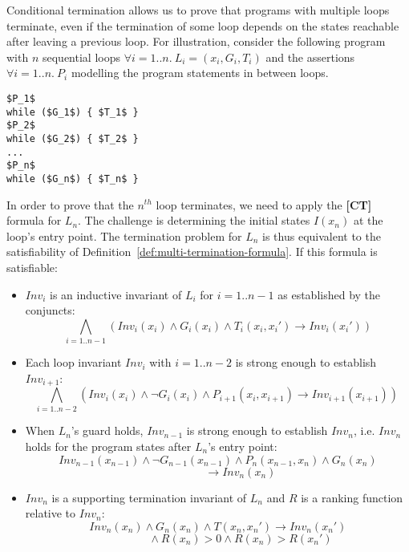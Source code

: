 \documentclass[preprint]{sigplanconf}
\theoremstyle{definition}
\begin{document}
\iffalse

Conditional termination allows us to
prove that programs with multiple loops terminate, even if the termination of some loop depends on the states
reachable after leaving a previous loop.
For illustration, consider the following program with $n$ sequential loops $\forall i=1..n. ~L_i=(x_i,G_i,T_i)$ and
the assertions $\forall i=1..n. ~P_i$ modelling the program statements in between loops. 

\begin{lstlisting}[mathescape=true]
$P_1$
while ($G_1$) { $T_1$ }
$P_2$
while ($G_2$) { $T_2$ }
...
$P_n$
while ($G_n$) { $T_n$ }
\end{lstlisting}

In order to prove that the $n^{th}$ loop terminates, we need to apply the {\bf [CT]} formula for $L_n$.
The challenge is determining the initial states  $I(x_n)$ at the loop's entry point.  
The termination problem for $L_n$ is thus equivalent to the satisfiability of
Definition~\ref{def:multi-termination-formula}.  If this formula is satisfiable:
\begin{itemize}
\item $Inv_i$ is an inductive invariant of $L_i$ for $i=1..{n-1}$ as established by the conjuncts:
$$\bigwedge_{i=1..n{-}1} (Inv_i(x_i) \wedge G_i(x_i) \wedge T_i(x_i, x_i') \rightarrow Inv_i(x_i')) $$

\item Each loop invariant $Inv_i$ with $i=1..{n-2}$ is strong enough to establish $Inv_{i+1}$:
$$\bigwedge_{i=1..n{-}2} (Inv_i(x_i) \wedge \lnot G_i(x_i) \wedge P_{i+1}(x_i, x_{i+1}) {\rightarrow} Inv_{i+1}(x_{i+1})) ~$$

\item When $L_n$'s guard holds, $Inv_{n-1}$ 
is strong enough to establish $Inv_n$, i.e. $Inv_n$ holds for the program states after $L_n$'s entry point:
$$ Inv_{n-1}(x_{n-1}) \wedge \lnot G_{n-1}(x_{n-1}) \wedge P_n(x_{n-1},x_n) \wedge G_n(x_n) $$
$$\qquad\qquad\rightarrow Inv_n(x_n)$$

\item $Inv_n$ is a supporting termination invariant of $L_n$ and $R$ is a ranking function relative to $Inv_n$:
$$Inv_n(x_n) \wedge G_n(x_n) \wedge T(x_n, x_n') \rightarrow Inv_n(x_n')$$
$$ \qquad \qquad \wedge R(x_n) > 0 \wedge R(x_n) > R(x_n')$$
\end{itemize}
\end{document}
